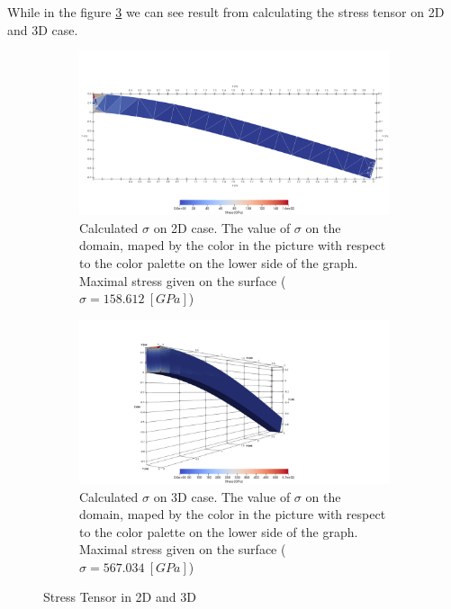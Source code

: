 \documentclass[a4paper,11pt]{article}
\begin{document}
\newline
While in the figure \ref{fig:stresstensor} we can see result from calculating the stress tensor on 2D and 3D case.
\begin{figure}[h!]
	\begin{subfigure}[b]{0.5\linewidth}
		\centering
		\includegraphics[width=\linewidth]{picture/conference/2dstress}
		\caption{Calculated $\sigma$ on 2D case. The value of $\sigma$ on the domain, maped by the color in the picture with respect to the color palette on the lower side of the graph. Maximal stress given on the surface ($\sigma = 158.612\ [GPa]$)}
		\label{fig:2dstress}
	\end{subfigure}
\quad
	\begin{subfigure}[b]{0.5\linewidth}
		\centering
		\includegraphics[width=\linewidth]{picture/conference/3dstress}
		\caption{Calculated $\sigma$ on 3D case. The value of $\sigma$ on the domain, maped by the color in the picture with respect to the color palette on the lower side of the graph. Maximal stress given on the surface ($\sigma = 567.034\ [GPa]$)}
		\label{fig:3dstress}
	\end{subfigure}
\caption{Stress Tensor in 2D and 3D}
\label{fig:stresstensor}
\end{figure}
\end{document}

